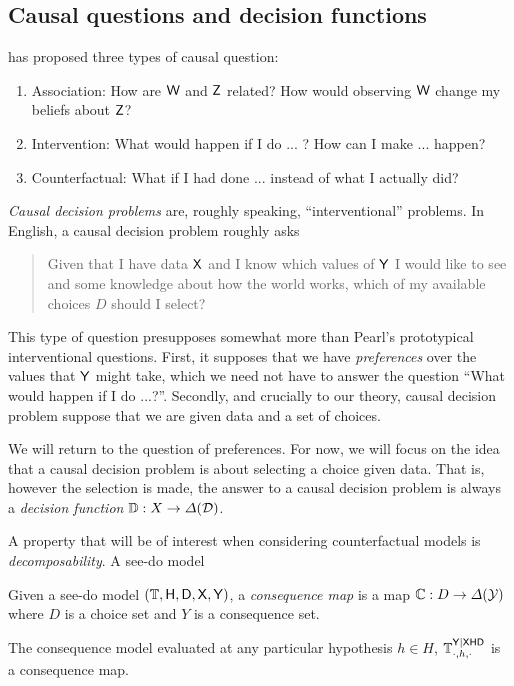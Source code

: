 \subsection{Causal questions and decision functions}

\citet{pearl_book_2018} has proposed three types of causal question:
\begin{enumerate}
    \item Association: How are $\mathsf{W}$ and $\mathsf{Z}$ related? How would observing $\mathsf{W}$ change my beliefs about $\mathsf{Z}$?
    \item Intervention: What would happen if I do ... ? How can I make ... happen?
    \item Counterfactual: What if I had done ... instead of what I actually did?
\end{enumerate}

\emph{Causal decision problems} are, roughly speaking, ``interventional'' problems. In English, a causal decision problem roughly asks

\begin{quote}
    Given that I have data $\mathsf{X}$ and I know which values of $\mathsf{Y}$ I would like to see and some knowledge about how the world works, which of my available choices $D$ should I select?
\end{quote}

This type of question presupposes somewhat more than Pearl's prototypical interventional questions. First, it supposes that we have \emph{preferences} over the values that $\mathsf{Y}$ might take, which we need not have to answer the question ``What would happen if I do ...?''. Secondly, and crucially to our theory, causal decision problem suppose that we are given data and a set of choices. 

We will return to the question of preferences. For now, we will focus on the idea that a causal decision problem is about selecting a choice given data. That is, however the selection is made, the answer to a causal decision problem is always a \emph{decision function} $\mathbb{D}:X\to \Delta(\mathcal{D})$.

A property that will be of interest when considering counterfactual models is \emph{decomposability}. A see-do model 



\begin{definition}
Given a see-do model $(\mathbb{T},\mathsf{H},\mathsf{D},\mathsf{X},\mathsf{Y})$, a \emph{consequence map} is a map $\mathbb{C}:D\to \Delta(\mathcal{Y})$ where $D$ is a choice set and $Y$ is a consequence set.

The consequence model evaluated at any particular hypothesis $h\in H$, $\mathbb{T}^{\mathsf{Y}|\mathsf{X}\mathsf{H}\mathsf{D}}_{\cdot,h,\cdot}$ is a consequence map.
\end{definition}

